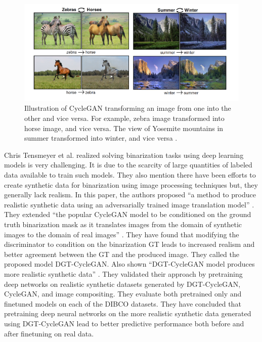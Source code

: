 \begin{figure}[H]
        \begin{center}
 	    \includegraphics[scale=0.35]{images/relatedWorks/CycleGANExamples.png}
	    \caption[Illustration of \ac{CycleGAN} transforming an image from one into the other and vice versa.]{Illustration of \ac{CycleGAN} transforming an image from one into the other and vice versa. For example, zebra image transformed into horse image, and vice versa. The view of Yosemite mountains in summer transformed into winter, and vice versa \cite{zhu2020unpaired}.}
	    \label{fig:CycleganExamples}
	    \end{center}
\end{figure}



Chris Tensmeyer et al.\cite{8978087} realized solving binarization tasks using deep learning models is very challenging. It is due to the scarcity of large quantities of labeled data available to train such models. They also mention there have been efforts to create synthetic data for binarization using image processing techniques but, they generally lack realism. In this paper, the authors proposed ``a method to produce realistic synthetic data using an adversarially trained image translation model'' \cite{8978087}. They extended ``the popular \ac{CycleGAN} model to be conditioned on the ground truth binarization mask as it translates images from the domain of synthetic images to the domain of real images'' \cite{8978087}. They have found that modifying the discriminator to condition on the binarization \ac{GT} leads to increased realism and better agreement between the \ac{GT} and the produced image. They called the proposed model DGT-CycleGAN. Also shown ``DGT-CycleGAN model produces more realistic synthetic data'' \cite{8978087}. They validated their approach by pretraining deep networks on realistic synthetic datasets generated by DGT-CycleGAN, \ac{CycleGAN}, and image compositing. They evaluate both pretrained only and finetuned models on each of the \ac{DIBCO} datasets. They have concluded that pretraining deep neural networks on the more realistic synthetic data generated using DGT-CycleGAN lead to better predictive performance both before and after finetuning on real data.



